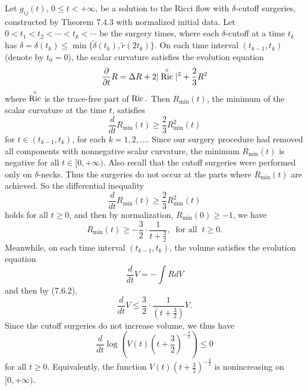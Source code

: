 Let $g_{ij}(t)$, $0 \leq t < +\infty$, be a solution to the Ricci
flow with $\delta$-cutoff surgeries, constructed by Theorem 7.4.3
with normalized initial data. Let $0<t_1<t_2<\cdots<t_k<\cdots$ be
the surgery times, where each $\delta$-cutoff at a time $t_k$ has
$\delta = \delta(t_k) \leq \min
\{\widetilde{\delta}(t_k),\widetilde{r}(2t_k)\}$. On each time
interval $(t_{k-1},t_k)$ (denote by $t_0=0$), the scalar curvature
satisfies the evolution equation \begin{equation} \frac{\partial}{\partial
t}R=\Delta
R+2|\stackrel{\circ}{\Ric}|^2+\frac{2}{3}R^2 %
\end{equation} where $\stackrel{\circ}{\operatorname{Ric}}$ is the trace-free part of
$\operatorname{Ric}.$ Then $R_{\min}(t)$, the minimum of the scalar curvature at
the time $t$, satisfies
$$
\frac{d}{dt}R_{\min}(t)\geq \frac{2}{3}R^2_{\min}(t)
$$
for $t\in(t_{k-1},t_k)$, for each $k = 1, 2, \ldots$. Since our
surgery procedure had removed all components with nonnegative
scalar curvature, the minimum $R_{\min}(t)$ is negative for all $t
\in [0,+\infty)$. Also recall that the cutoff surgeries were
performed only on $\delta$-necks. Thus the surgeries do not occur
at the parts where $R_{\min}(t)$ are achieved. So the differential
inequality
$$
\frac{d}{dt}R_{\min}(t)\geq \frac{2}{3}R^2_{\min}(t)
$$
holds for all $t\geq 0$, and then by normalization,
$R_{\min}(0)\geq -1$, we have \begin{equation} R_{\min}(t)\geq
-\frac{3}{2}\cdot\frac{1}{t+\frac{3}{2}}, \
\mbox{ for all } \ t\geq 0. %
\end{equation} Meanwhile, on each time interval $(t_{k-1},t_k)$, the volume
satisfies the evolution equation
$$
\frac{d}{dt}V=-\int RdV
$$
and then by (7.6.2),
$$
\frac{d}{dt}V\leq \frac{3}{2}\cdot\frac{1}{(t+\frac{3}{2})}V.
$$
Since the cutoff surgeries do not increase volume, we thus have
\begin{equation} \frac{d}{dt}\log\left(V(t)\left(t+\frac{3}{2}\right)^{-\frac{3}{2}}\right)\leq 0
\end{equation} for all $t\geq 0$. Equivalently, the function
$V(t)(t+\frac{3}{2})^{-\frac{3}{2}}$ is nonincreasing on
$[0,+\infty)$.


